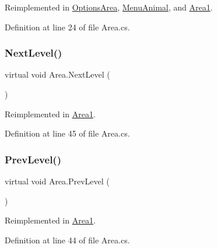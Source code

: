 Reimplemented in \mbox{\hyperlink{class_options_area_a8a38de01790a717037f8c3aae3e83b85}{Options\+Area}}, \mbox{\hyperlink{class_menu_animal_af53d9975856687f698eccf7d45c83a24}{Menu\+Animal}}, and \mbox{\hyperlink{class_area1_afe0c3d9815116a2467fb75b4c2e71df7}{Area1}}.



Definition at line 24 of file Area.\+cs.

\mbox{\label{class_area_a097fdec8cbc515c14e45de2c9cd07046}} 
\subsubsection{\texorpdfstring{Next\+Level()}{NextLevel()}}
{\footnotesize\ttfamily virtual void Area.\+Next\+Level (\begin{DoxyParamCaption}{ }\end{DoxyParamCaption})\hspace{0.3cm}{\ttfamily [virtual]}}



Reimplemented in \mbox{\hyperlink{class_area1_a232eae9b5f4ebdc861d036654b947303}{Area1}}.



Definition at line 45 of file Area.\+cs.

\mbox{\label{class_area_a17eb7b6ddece1384c868a0c655cd98c4}} 
\subsubsection{\texorpdfstring{Prev\+Level()}{PrevLevel()}}
{\footnotesize\ttfamily virtual void Area.\+Prev\+Level (\begin{DoxyParamCaption}{ }\end{DoxyParamCaption})\hspace{0.3cm}{\ttfamily [virtual]}}



Reimplemented in \mbox{\hyperlink{class_area1_af49f1117a0338b89224481a3708b57d9}{Area1}}.



Definition at line 44 of file Area.\+cs.

\mbox{\label{class_area_a0f04f37327aab840cc0d4ba97c7d19ff}} 
